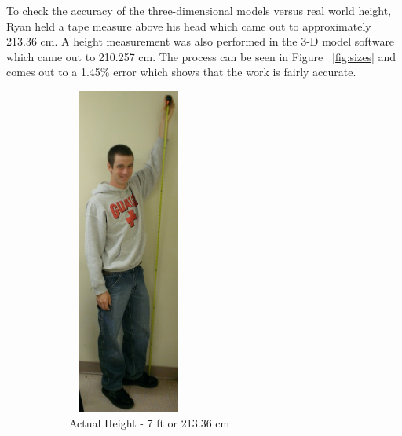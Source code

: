 \documentclass[pdftex,10.5pt]{report}
\begin{document}
To check the accuracy of the three-dimensional models versus real world height, Ryan held a tape measure above his head which came out to approximately 213.36 cm. A height measurement was also performed in the 3-D model software which came out to 210.257 cm. The process can be seen in Figure ~\ref{fig:sizes} and comes out to a 1.45\% error which shows that the work is fairly accurate.

\begin{figure}[H]
	\centering
	\begin{subfigure}[H]{0.4\textwidth}
		\includegraphics[height=108mm, width=40mm]{figures/ryanmeasure}
		\caption{Actual Height - 7 ft or 213.36 cm}
	\end{subfigure}
	\begin{subfigure}[H]{0.4\textwidth}

\end{subfigure}
\end{figure}
\end{document}
